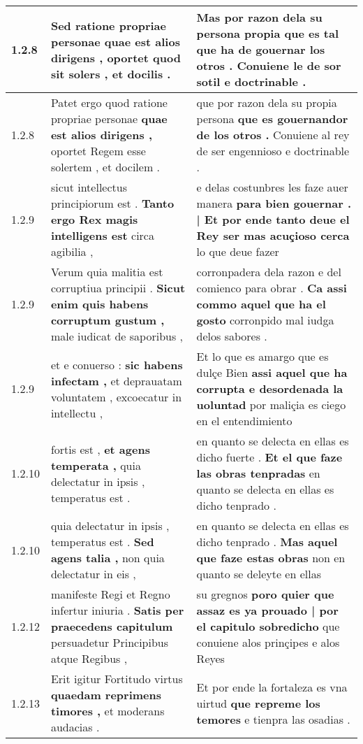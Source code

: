 \begin{tabular}{|p{1cm}|p{6.5cm}|p{6.5cm}|}
1.2.8 & Sed ratione propriae personae \textbf{ quae est alios dirigens , } oportet quod sit solers , et docilis . & Mas por razon dela su persona propia \textbf{ que es tal que ha de gouernar los otros . } Conuiene le de sor sotil e doctrinable . \\\hline
1.2.8 & Patet ergo quod ratione propriae personae \textbf{ quae est alios dirigens , } oportet Regem esse solertem , et docilem . & que por razon dela su propia persona \textbf{ que es gouernandor de los otros . } Conuiene al rey de ser engennioso e doctrinable . \\\hline
1.2.9 & sicut intellectus principiorum est . \textbf{ Tanto ergo Rex magis intelligens est } circa agibilia , & e delas costunbres les faze auer manera \textbf{ para bien gouernar . | Et por ende tanto deue el Rey ser mas acuçioso cerca } lo que deue fazer \\\hline
1.2.9 & Verum quia malitia est corruptiua principii . \textbf{ Sicut enim quis habens corruptum gustum , } male iudicat de saporibus , & corronpadera dela razon e del comienco para obrar . \textbf{ Ca assi commo aquel que ha el gosto } corronpido mal iudga delos sabores . \\\hline
1.2.9 & et e conuerso : \textbf{ sic habens infectam , } et deprauatam voluntatem , excoecatur in intellectu , & Et lo que es amargo que es dulçe Bien \textbf{ assi aquel que ha corrupta e desordenada la uoluntad } por maliçia es ciego en el entendimiento \\\hline
1.2.10 & fortis est , \textbf{ et agens temperata , } quia delectatur in ipsis , temperatus est . & en quanto se delecta en ellas es dicho fuerte . \textbf{ Et el que faze las obras tenpradas } en quanto se delecta en ellas es dicho tenprado . \\\hline
1.2.10 & quia delectatur in ipsis , temperatus est . \textbf{ Sed agens talia , } non quia delectatur in eis , & en quanto se delecta en ellas es dicho tenprado . \textbf{ Mas aquel que faze estas obras } non en quanto se deleyte en ellas \\\hline
1.2.12 & manifeste Regi et Regno infertur iniuria . \textbf{ Satis per praecedens capitulum } persuadetur Principibus atque Regibus , & su gregnos \textbf{ poro quier que assaz es ya prouado | por el capitulo sobredicho } que conuiene alos prinçipes e alos Reyes \\\hline
1.2.13 & Erit igitur Fortitudo virtus \textbf{ quaedam reprimens timores , } et moderans audacias . & Et por ende la fortaleza es vna uirtud \textbf{ que repreme los temores } e tienpra las osadias . \\\hline

\end{tabular}
